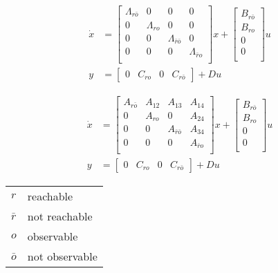 \begin{align*}
    \dot{x} & = \begin{bmatrix}
                    \Lambda_{r\bar{o}} & 0            & 0                        & 0                  \\
                    0                  & \Lambda_{ro} & 0                        & 0                  \\
                    0                  & 0            & \Lambda_{\bar{r}\bar{o}} & 0                  \\
                    0                  & 0            & 0                        & \Lambda_{\bar{r}o} \\
                \end{bmatrix}
    x + \begin{bmatrix}
            B_{r\bar{o}} \\
            B_{ro}       \\
            0            \\
            0            \\
        \end{bmatrix}
    u                                                                                                                          \\
    y       & = \begin{bmatrix}
                    0 & C_{ro} & 0 & C_{r\bar{o}}
                \end{bmatrix}
    + Du
\end{align*}

\begin{align*}
    \dot{x} & = \begin{bmatrix}
                    A_{r\bar{o}} & A_{12} & A_{13}             & A_{14}       \\
                    0            & A_{ro} & 0                  & A_{24}       \\
                    0            & 0      & A_{\bar{r}\bar{o}} & A_{34}       \\
                    0            & 0      & 0                  & A_{\bar{r}o} \\
                \end{bmatrix}
    x + \begin{bmatrix}
            B_{r\bar{o}} \\
            B_{ro}       \\
            0            \\
            0            \\
        \end{bmatrix}
    u                                                                                                   \\
    y       & = \begin{bmatrix}
                    0 & C_{ro} & 0 & C_{r\bar{o}}
                \end{bmatrix}
    + Du
\end{align*}

\newpar{}

\begin{tabularx}{\linewidth}{@{}ll@{}}
    $r$       & reachable      \\
    $\bar{r}$ & not reachable  \\
    $o$       & observable     \\
    $\bar{o}$ & not observable \\
\end{tabularx}
